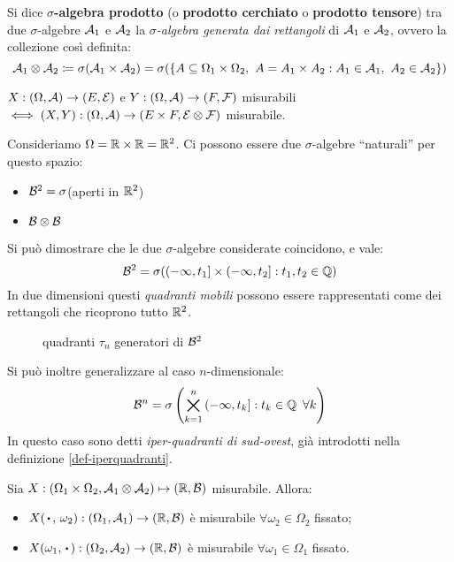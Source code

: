 \begin{defn} \label{def-sigma-alebra-prodotto}
	Si dice \textbf{$\sigma$-algebra prodotto} (o \textbf{prodotto cerchiato} o \textbf{prodotto tensore}) tra due $\sigma$-algebre $\mathcal A_1$ e $\mathcal A_2$ la \emph{$\sigma$-algebra generata dai rettangoli} di $\mathcal A_1$ e $\mathcal A_2$, ovvero la collezione così definita:
	$$\mathcal A_1 \otimes \mathcal A_2 \coloneqq \sigma (\mathcal A_1 \times \mathcal A_2) = \sigma (\{ A \subseteq \Omega_1\times\Omega_2, \ A=A_1 \times A_2: A_1 \in \mathcal A_1, \ A_2 \in \mathcal A_2 \})$$
\end{defn}

\medskip
\begin{oss}
  $X:(\Omega, \mathcal A)\to(E,\mathcal E)$ e $Y:(\Omega, \mathcal A)\to(F,\mathcal F)$ misurabili $\iff (X,Y):(\Omega,\mathcal A)\to(E \times F, \mathcal E\otimes\mathcal F)$ misurabile.
\end{oss}

\begin{ese}\label{ese-iperquadranti}
  Consideriamo $\Omega = \mathbb R \times \mathbb R=\mathbb R^2$. Ci possono essere due $\sigma$-algebre ``naturali'' per questo spazio:
  \begin{itemize}
    \item $\mathcal B^2=\sigma$(aperti in $\mathbb R^2$)
    \item $\mathcal B \otimes \mathcal B$
  \end{itemize}
Si può dimostrare che le due $\sigma$-algebre considerate coincidono, e vale:
$$\mathcal B^2=\sigma(\left (-\infty,t_1 \right ] \times \left (-\infty,t_2 \right ]: t_1, t_2 \in \mathbb Q) $$
In due dimensioni questi \textit{quadranti mobili} possono essere rappresentati come dei rettangoli che ricoprono tutto $\mathbb R^2$.
\begin{figure}[H]
  \centering
  
  \caption{quadranti $\tau_n$ generatori di $\mathcal B^2$}
\end{figure}
\end{ese}
Si può inoltre generalizzare al caso $n$-dimensionale:
$$\mathcal B^n= \sigma\left( \bigtimes\limits_{k=1}^n \left( -\infty,t_k \right]: t_k \in \mathbb Q \enspace \forall k \right) $$
In questo caso sono detti \emph{iper-quadranti di sud-ovest}, già introdotti nella definizione \ref{def-iperquadranti}.

\medskip
\begin{teo}
  Sia $X:(\Omega_1 \times \Omega_2, \mathcal A_1 \otimes \mathcal A_2) \mapsto(\mathbb R, \mathcal B)$ misurabile. Allora:
  \begin{itemize}
    \item   $ X( \, \bigcdot \,, \, \omega_2):(\Omega_1, \Ac_1)\to(\RR, \Bc)$ è misurabile $\forall \omega_2 \in \Omega_2$ fissato;
    \item $X(\omega_1, \, \bigcdot \,):(\Omega_2, \Ac_2)\to(\RR, \Bc)$ è misurabile $ \forall \omega_1 \in \Omega_1$ fissato.
  \end{itemize}
\end{teo}

